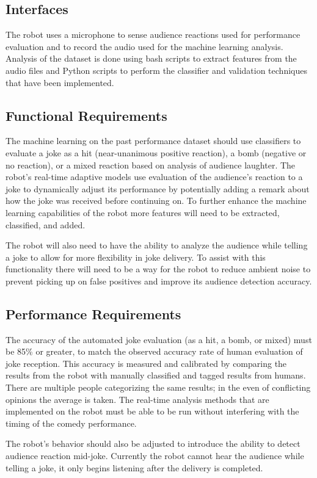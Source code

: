 \documentclass[onecolumn, draftclsnofoot,10pt, compsoc]{IEEEtran}
\begin{document}
\subsection{Interfaces}
The robot uses a microphone to sense audience reactions used for performance evaluation and to record the audio used for the machine learning analysis. Analysis of the dataset is done using bash scripts to extract features from the audio files and Python scripts to perform the classifier and validation techniques that have been implemented.
\subsection{Functional Requirements}
The machine learning on the past performance dataset should use classifiers to evaluate a joke as a hit (near-unanimous positive reaction), a bomb (negative or no reaction), or a mixed reaction based on analysis of audience laughter. The robot's real-time adaptive models use evaluation of the audience's reaction to a joke to dynamically adjust its performance by potentially adding a remark about how the joke was received before continuing on. To further enhance the machine learning capabilities of the robot more features will need to be extracted, classified, and added.\par
\vspace{.4cm}
\noindent The robot will also need to have the ability to analyze the audience while telling a joke to allow for more flexibility in joke delivery. To assist with this functionality there will need to be a way for the robot to reduce ambient noise to prevent picking up on false positives and improve its audience detection accuracy.
\subsection{Performance Requirements}
The accuracy of the automated joke evaluation (as a hit, a bomb, or mixed) must be 85\% or greater, to match the observed accuracy rate of human evaluation of joke reception. This accuracy is measured and calibrated by comparing the results from the robot with manually classified and tagged results from humans. There are multiple people categorizing the same results; in the even of conflicting opinions the average is taken. The real-time analysis methods that are implemented on the robot must be able to be run without interfering with the timing of the comedy performance.\par
\vspace{.4cm}
\noindent The robot's behavior should also be adjusted to introduce the ability to detect audience reaction mid-joke. Currently the robot cannot hear the audience while telling a joke, it only begins listening after the delivery is completed.
\end{document}
